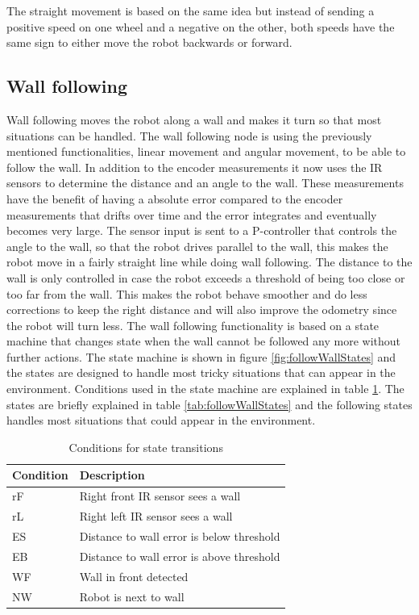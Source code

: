 The straight movement is based on the same idea but instead of sending a positive speed on one wheel and a negative on the other, both speeds have the same sign to either move the robot backwards or forward. 

\subsection{Wall following}
\label{subsec:wallFollowing}

Wall following moves the robot along a wall and makes it turn so that most situations can be handled. The wall following node is using the previously mentioned functionalities, linear movement and angular movement, to be able to follow the wall. In addition to the encoder measurements it now uses the IR sensors to determine the distance and an angle to the wall. These measurements have the benefit of having a absolute error compared to the encoder measurements that drifts over time and the error integrates and eventually becomes very large.
	The sensor input is sent to a P-controller that controls the angle to the wall, so that the robot drives parallel to the wall, this makes the robot move in a fairly straight line while doing wall following. The distance to the wall is only controlled in case the robot exceeds a threshold of being too close or too far from the wall. This makes the robot behave smoother and do less corrections to keep the right distance and will also improve the odometry since the robot will turn less.
	The wall following functionality is based on a state machine that changes state when the wall cannot be followed any more without further actions. The state machine is shown in figure  \ref{fig:followWallStates} and the states are designed to handle most tricky situations that can appear in the environment. Conditions used in the state machine are explained in table \ref{tab:conditions}. The states are briefly explained in table \ref{tab:followWallStates} and the following states handles most situations that could appear in the environment.

\begin{table}[h!]
\caption{Conditions for state transitions}
\centering
  \begin{tabular}{l|l}
    \textbf{Condition} & \textbf{Description} \\ \hline
    rF & Right front IR sensor sees a wall \\ \hline
    rL & Right left IR sensor sees a wall \\ \hline
    ES & Distance to wall error is below threshold \\ \hline
    EB & Distance to wall error is above threshold \\ \hline
    WF & Wall in front detected \\ \hline
    NW & Robot is next to wall \\
  \end{tabular}
  \label{tab:conditions}
\normalsize
\end{table}

